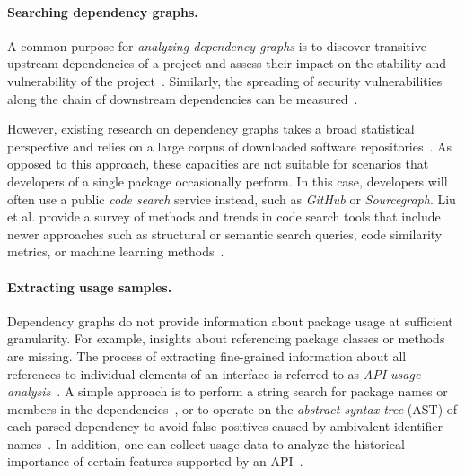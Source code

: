 \documentclass[a4paper,twoside]{article}
\begin{document}
\paragraph{Searching dependency graphs.}
\label{sec:related_work/dependencies}
A common purpose for \emph{analyzing dependency graphs} is to discover transitive upstream dependencies of a project and assess their impact on the stability and vulnerability of the project~\cite{kikas2017structure}.
Similarly, the spreading of security vulnerabilities along the chain of downstream dependencies can be measured~\cite{decan2018impact}.

However, existing research on dependency graphs takes a broad statistical perspective and relies on a large corpus of downloaded software repositories~\cite{abdalkareem2017developers,kikas2017structure,katz2020libraries}.
As opposed to this approach, these capacities are not suitable for scenarios that developers of a single package occasionally perform.
In this case, developers will often use a public \emph{code search} service instead, such as \emph{GitHub} or \emph{Sourcegraph}.
Liu et al. provide a survey of methods and trends in code search tools that include newer approaches such as structural or semantic search queries, code similarity metrics, or machine learning methods~\cite{liu2020opportunities}.

\paragraph{Extracting usage samples.}
\label{sec:related_work/usage_samples}
Dependency graphs do not provide information about package usage at sufficient granularity. For example, insights about referencing package classes or methods are missing.
The process of extracting fine-grained information about all references to individual elements of an interface is referred to as \emph{API usage analysis}~\cite{lammel2011large}.
A simple approach is to perform a string search for package names or members in the dependencies~\cite{mileva2010mining}, or to operate on the \emph{abstract syntax tree} (AST) of each parsed dependency to avoid false positives caused by ambivalent identifier names~\cite{qiu2016understanding}.
In addition, one can collect usage data to analyze the historical importance of certain features supported by an API~\cite{sawant2017fine}.
\end{document}
